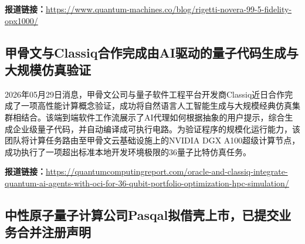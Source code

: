 \documentclass[12pt,a4paper]{ctexart}
\begin{document}
\noindent\textbf{报道链接：}\url{https://www.quantum-machines.co/blog/rigetti-novera-99-5-fidelity-opx1000/}

\subsection{ 甲骨文与Classiq合作完成由AI驱动的量子代码生成与大规模仿真验证 }

2026年05月29日消息，甲骨文公司与量子软件工程平台开发商Classiq近日合作完成了一项高性能计算概念验证，成功将自然语言人工智能生成与大规模经典仿真集群相结合。该端到端软件工作流展示了AI代理如何根据抽象的用户提示，综合生成企业级量子代码，并自动编译成可执行电路。为验证程序的规模化运行能力，该团队将计算任务路由至甲骨文云基础设施上的NVIDIA DGX A100超级计算节点，成功执行了一项超出标准本地开发环境极限的36量子比特仿真任务。

\noindent\textbf{报道链接：}\url{https://quantumcomputingreport.com/oracle-and-classiq-integrate-quantum-ai-agents-with-oci-for-36-qubit-portfolio-optimization-hpc-simulation/}

\subsection{ 中性原子量子计算公司Pasqal拟借壳上市，已提交业务合并注册声明 }
\end{document}
